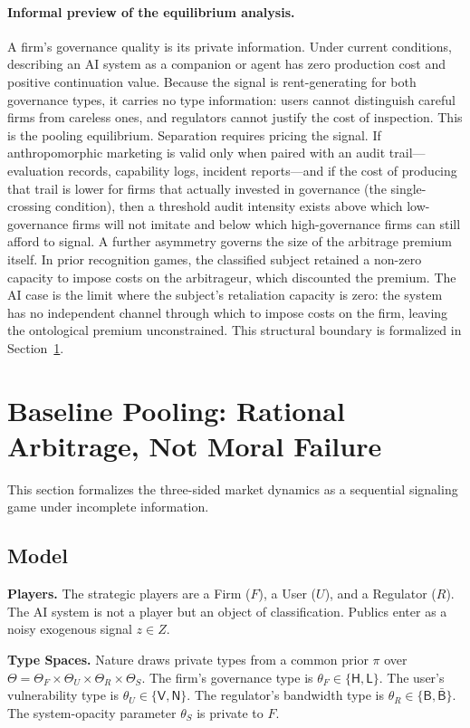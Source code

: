 \documentclass[preprint,authoryear]{elsarticle}
\theoremstyle{definition}
\theoremstyle{plain}
\begin{document}
\paragraph{Informal preview of the equilibrium analysis.}
A firm's governance quality is its private information. Under current conditions, describing an AI system as a companion or agent has zero production cost and positive continuation value. Because the signal is rent-generating for both governance types, it carries no type information: users cannot distinguish careful firms from careless ones, and regulators cannot justify the cost of inspection. This is the pooling equilibrium. Separation requires pricing the signal. If anthropomorphic marketing is valid only when paired with an audit trail---evaluation records, capability logs, incident reports---and if the cost of producing that trail is lower for firms that actually invested in governance (the single-crossing condition), then a threshold audit intensity exists above which low-governance firms will not imitate and below which high-governance firms can still afford to signal. A further asymmetry governs the size of the arbitrage premium itself. In prior recognition games, the classified subject retained a non-zero capacity to impose costs on the arbitrageur, which discounted the premium. The AI case is the limit where the subject's retaliation capacity is zero: the system has no independent channel through which to impose costs on the firm, leaving the ontological premium unconstrained. This structural boundary is formalized in Section~\ref{sec:bayesian}.
\section{Baseline Pooling: Rational Arbitrage, Not Moral Failure}
\label{sec:bayesian}

This section formalizes the three-sided market dynamics as a sequential signaling game under incomplete information. 

\subsection{Model}

\textbf{Players.} The strategic players are a Firm ($F$), a User ($U$), and a Regulator ($R$). The AI system is not a player but an object of classification. Publics enter as a noisy exogenous signal $z \in Z$. 

\textbf{Type Spaces.} Nature draws private types from a common prior $\pi$ over $\Theta = \Theta_F \times \Theta_U \times \Theta_R \times \Theta_S$. The firm's governance type is $\theta_F \in \{\mathsf{H},\mathsf{L}\}$. The user's vulnerability type is $\theta_U \in \{\mathsf{V},\mathsf{N}\}$. The regulator's bandwidth type is $\theta_R \in \{\mathsf{B},\bar{\mathsf{B}}\}$. The system-opacity parameter $\theta_S$ is private to $F$.
\end{document}
